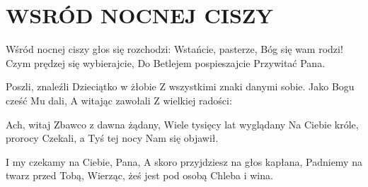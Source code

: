 \documentclass[../../../songbook.tex]{subfiles}
\begin{document}
\TabPositions{8cm} %
\section*{WSRÓD NOCNEJ CISZY}
{}
\vspace{0.5cm}
Wśród nocnej ciszy głos się rozchodzi:		 \newline	
Wstańcie, pasterze, Bóg się wam rodzi!		 \newline	
Czym prędzej się wybierajcie,			  	 \newline	
Do Betlejem pospieszajcie				 	 \newline	
Przywitać Pana.						  		 \newline	

\-\hspace{1cm} Poszli, znaleźli Dzieciątko w żłobie \newline
\-\hspace{1cm} Z wszystkimi znaki danymi sobie. \newline
\-\hspace{1cm} Jako Bogu cześć Mu dali, \newline
\-\hspace{1cm} A witając zawołali \newline
\-\hspace{1cm} Z wielkiej radości: \newline

Ach, witaj Zbawco z dawna żądany, \newline
Wiele tysięcy lat wyglądany \newline
Na Ciebie króle, prorocy \newline
Czekali, a Tyś tej nocy \newline
Nam się objawił. \newline

\-\hspace{1cm} I my czekamy na Ciebie, Pana, \newline
\-\hspace{1cm} A skoro przyjdziesz na głos kapłana, \newline
\-\hspace{1cm} Padniemy na twarz przed Tobą, \newline
\-\hspace{1cm} Wierząc, żeś jest pod osobą \newline
\-\hspace{1cm} Chleba i wina. \newline
\end{document}
